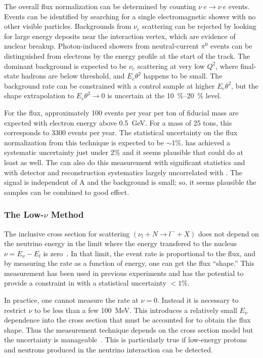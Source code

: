 The overall flux normalization can be determined by counting $\nu \ e \rightarrow \nu \ e$ events. Events can be identified by searching for a single electromagnetic shower with no other visible particles. Backgrounds from $\nu_{e}$  scattering can be rejected by looking for large energy deposits near the interaction vertex, which are evidence of nuclear breakup. Photon-induced showers from neutral-current $\pi^{0}$ events can be distinguished from electrons by the energy profile at the start of the track. The dominant background is expected to be $\nu_{e}$  scattering at very low $Q^{2}$, where final-state hadrons are below threshold, and $E_{e}\theta^{2}$ happens to be small. The background rate can be constrained with a control sample at higher $E_{e}\theta^{2}$, but the shape extrapolation to $E_{e}\theta^{2} \rightarrow 0$ is uncertain at the \SIrange{10}{20}{\%} level.

For the  flux, approximately \num{100} events per year per ton of fiducial mass are expected with electron energy above \SI{0.5}{GeV}. For a  mass of 25 tons, this corresponds to \num{3300} events per year. The statistical uncertainty on the flux normalization from this technique is expected to be $\sim$1\%.  has achieved a systematic uncertainty just under 2\% and it seems plausible that \dune could do at least as well\cite{bib:minervanue}. The  can also do this measurement with significant statistics and with detector and reconstruction systematics largely uncorrelated with .  The signal is independent of A and the background is small; so, it seems plausible the samples can be combined to good effect.


\subsubsection{The Low-$\nu$ Method}
\label{ssec:intro-low-nu}
The inclusive cross section for  scattering $(\nu_l+N\rightarrow l^-+X)$ does not depend on the neutrino energy in the limit where the energy transfered to the nucleus $\nu = E_\nu-E_{l} $ is zero~\cite{bib:original_lownu}.  In that limit, the event rate is proportional to the flux, and by measuring the rate as a function of energy, one can get the flux ``shape.'' This measurement has been used in previous experiments and has the potential to provide a constraint in \dune with a statistical uncertainty $<1\%$.

In practice, one cannot measure the rate at $\nu=0$. Instead it is necessary to restrict $\nu$ to be less than a few \SI{100}{MeV}.  This introduces a relatively small $E_\nu$ dependence into the cross section that must be accounted for to obtain the flux shape. Thus the  measurement technique depends on the cross section model but the uncertainty is manageable~\cite{bib:bodek_lownu}. This is particularly true if low-energy protons and neutrons produced in the neutrino interaction can be detected. 


